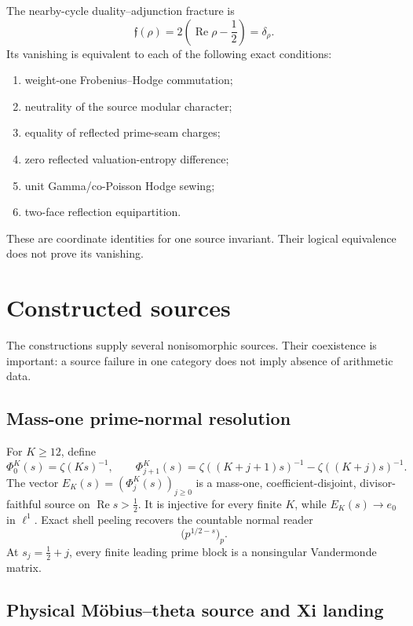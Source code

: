 \documentclass[11pt]{article}
\theoremstyle{definition}
\theoremstyle{remark}
\newcommand{\Rea}{\operatorname{Re}}
\begin{document}
The nearby-cycle duality--adjunction fracture is
\[
 \mathfrak f(\rho)=2\left(\Rea\rho-\frac12\right)
                  =\delta_\rho.
\tag{2.6}\label{eq:fracture}
\]
Its vanishing is equivalent to each of the following exact conditions:
\begin{enumerate}[label=\textup{(\alph*)},leftmargin=2.2em]
\item weight-one Frobenius--Hodge commutation;
\item neutrality of the source modular character;
\item equality of reflected prime-seam charges;
\item zero reflected valuation-entropy difference;
\item unit Gamma/co-Poisson Hodge sewing;
\item two-face reflection equipartition.
\end{enumerate}
These are coordinate identities for one source invariant.  Their logical
equivalence does not prove its vanishing.

\section{Constructed sources}
\label{sec:sources}

The constructions supply several nonisomorphic sources.  Their coexistence is
important: a source failure in one category does not imply absence of
arithmetic data.

\subsection{Mass-one prime-normal resolution}

For \(K\ge12\), define
\[
 \Phi^K_0(s)=\zeta(Ks)^{-1},\qquad
 \Phi^K_{j+1}(s)=
   \zeta((K+j+1)s)^{-1}-\zeta((K+j)s)^{-1}.
\tag{3.1}\label{eq:positive-resolution}
\]
The vector \(E_K(s)=(\Phi^K_j(s))_{j\ge0}\) is a mass-one,
coefficient-disjoint, divisor-faithful source on
\(\Rea s>\tfrac12\).  It is injective for every finite \(K\), while
\(E_K(s)\to e_0\) in \(\ell^1\).  Exact shell peeling recovers the
countable normal reader
\[
                        \bigl(p^{1/2-s}\bigr)_p .
\tag{3.2}\label{eq:normal-reader}
\]
At \(s_j=\tfrac12+j\), every finite leading prime block is a nonsingular
Vandermonde matrix.

\subsection{Physical M\"obius--theta source and Xi landing}
\end{document}

